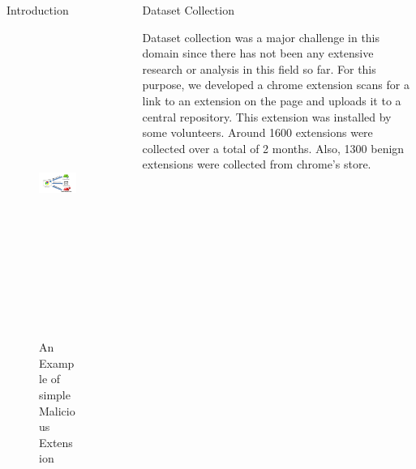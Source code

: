 \documentclass[final]{beamer}
\newlength{\sepwid}
\newlength{\onecolwid}
\newlength{\twocolwid}
\begin{document}
\begin{frame}[t]
\begin{columns}[t]
\begin{column}{\onecolwid}
\begin{block}{Introduction}
\begin{figure}
\includegraphics[height=10cm,width=25cm]{intro.png}
\caption{An Example of simple Malicious Extension}
\end{figure}

\end{block}





\end{column} %

\begin{column}{\sepwid}\end{column} %

\begin{column}{\twocolwid} %
\begin{block}{Dataset Collection}
\end{block}


\vspace{-1in}
Dataset collection was a major challenge in this domain since there has not been any extensive research or analysis in this field so far. For this purpose, we developed a chrome extension scans for a link to an extension on the page and uploads it to a central repository. This extension was installed by some volunteers. Around 1600 extensions were collected over a total of 2 months. Also, 1300 benign extensions were collected from chrome's store.



\end{column}
\end{columns}
\end{frame}
\end{document}
